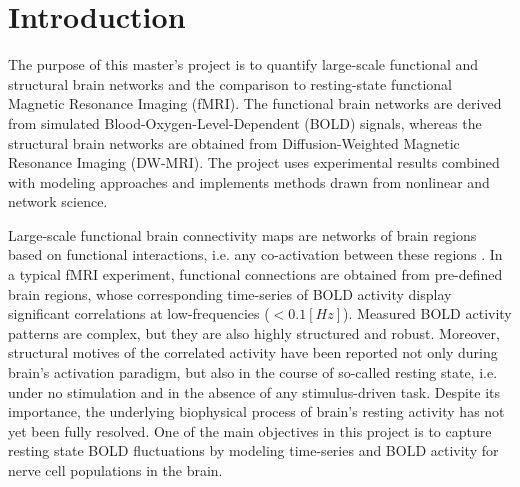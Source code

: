 
\chapter{Introduction} %

\label{Chapter1} %





The purpose of this master's project is to quantify large-scale functional and structural brain networks and the comparison to resting-state functional Magnetic Resonance Imaging (fMRI). The functional brain networks are derived from simulated Blood-Oxygen-Level-Dependent (BOLD) signals, whereas the structural brain networks are obtained from Diffusion-Weighted Magnetic Resonance Imaging (DW-MRI). The project uses experimental results combined with modeling approaches and implements methods drawn from nonlinear and network science. 

Large-scale functional brain connectivity maps are networks of brain regions based on functional interactions, i.e. any co-activation between these regions \citep{BIS95, BRE10b, DAM06}. In a typical fMRI experiment,  functional connections are obtained from pre-defined brain regions, whose corresponding time-series of BOLD activity display significant correlations at low-frequencies ($< 0.1 [Hz]$). Measured BOLD activity patterns are complex, but they are also highly structured and robust. Moreover, structural motives of the correlated activity have been reported not only during brain's activation paradigm, but also in the course of so-called resting state, i.e. under no stimulation and in the absence of any stimulus-driven task. Despite its importance, the underlying biophysical process of brain's resting activity has not yet been fully resolved. One of the main objectives in this project is to capture resting state BOLD fluctuations by modeling time-series and BOLD activity for nerve cell populations in the brain. 

